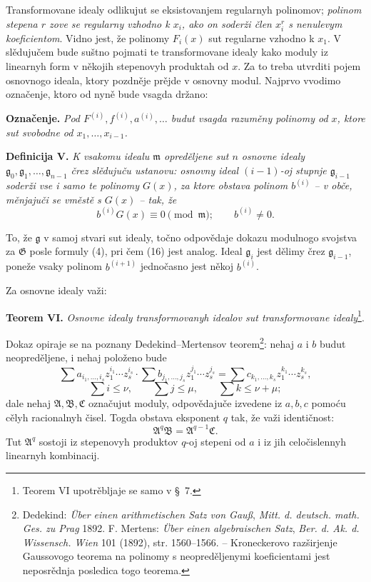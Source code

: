 \documentclass[11pt]{article}
\providecommand{\Amod}{\mathfrak A}
\providecommand{\Bmod}{\mathfrak B}
\providecommand{\Gmod}{\mathfrak G}
\providecommand{\mideal}{\mathfrak m}
\providecommand{\gideal}{\mathfrak g}
\providecommand{\zero}[1]{\equiv 0\pmod{#1}}
\begin{document}
Transformovane idealy odlikujut se eksistovanjem regularnyh polinomov; {\itshape polinom stepena $r$ zove se regularny vzhodno k $x_i$, ako on soderži člen $x_i^r$ s nenulevym koeficientom}. Vidno jest, že polinomy $F_i(x)$ sut regularne vzhodno k $x_1$. V slědujučem bude suštno pojmati te transformovane idealy kako moduly iz linearnyh form v někojih stepenovyh produktah od $x$. Za to treba utvrditi pojem osnovnogo ideala, ktory pozdněje prějde v osnovny modul. Najprvo vvodimo označenje, ktoro od nyně bude vsagda držano:

\medskip
\noindent\textbf{Označenje.} {\itshape Pod $F^{(i)},f^{(i)},a^{(i)},\ldots$ budut vsagda razuměny polinomy od $x$, ktore sut svobodne od $x_1,\ldots,x_{i-1}$.}

\medskip
\noindent\textbf{Definicija V.} {\itshape K vsakomu idealu $\mideal$ opreděljene sut $n$ osnovne idealy $\gideal_0,\gideal_1,\ldots,\gideal_{n-1}$ črez slědujuču ustanovu: osnovny ideal $(i-1)$-oj stupnje $\gideal_{i-1}$ soderži vse i samo te polinomy $G(x)$, za ktore obstava polinom $b^{(i)}$ -- v obče, měnjajuči se vměstě s $G(x)$ -- tak, že}
\begin{equation}
 b^{(i)}G(x)\zero{\mideal};\qquad b^{(i)}\ne0.
\tag{16}
\end{equation}

To, že $\gideal$ v samoj stvari sut idealy, točno odpovědaje dokazu modulnogo svojstva za $\Gmod$ posle formuly (4), pri čem (16) jest analog. Ideal $\gideal_i$ jest dělimy črez $\gideal_{i-1}$, poneže vsaky polinom $b^{(i+1)}$ jednočasno jest někoj $b^{(i)}$.

Za osnovne idealy važi:

\medskip
\noindent\textbf{Teorem VI.} {\itshape Osnovne idealy transformovanyh idealov sut transformovane idealy}\footnote{Teorem VI upotrěbljaje se samo v §~7.}.

Dokaz opiraje se na poznany Dedekind--Mertensov teorem\footnote{Dedekind: \emph{Über einen arithmetischen Satz von Gauß}, \emph{Mitt. d. deutsch. math. Ges. zu Prag} 1892. F. Mertens: \emph{Über einen algebraischen Satz}, \emph{Ber. d. Ak. d. Wissensch. Wien} 101 (1892), str. 1560--1566. -- Kroneckerovo razširjenje Gaussovogo teorema na polinomy s neopreděljenymi koeficientami jest neposrědnja posledica togo teorema.}: nehaj $a$ i $b$ budut neopreděljene, i nehaj položeno bude
\[
 \sum a_{i_1,\ldots,i_s}z_1^{i_1}\cdots z_s^{i_s}\cdot
 \sum b_{j_1,\ldots,j_s}z_1^{j_1}\cdots z_s^{j_s}
 =
 \sum c_{k_1,\ldots,k_s}z_1^{k_1}\cdots z_s^{k_s},
\]
\[
 \sum i\le \nu,
 \qquad
 \sum j\le \mu,
 \qquad
 \sum k\le \nu+\mu;
\]
dale nehaj $\Amod,\Bmod,\mathfrak C$ označujut moduly, odpovědajuče izvedene iz $a,b,c$ pomoću cělyh racionalnyh čisel. Togda obstava eksponent $q$ tak, že važi identičnost:
\begin{equation}
 \Amod^q\Bmod=\Amod^{q-1}\mathfrak C.
\tag{17}
\end{equation}
Tut $\Amod^q$ sostoji iz stepenovyh produktov $q$-oj stepeni od $a$ i iz jih celočislennyh linearnyh kombinacij.
\end{document}
